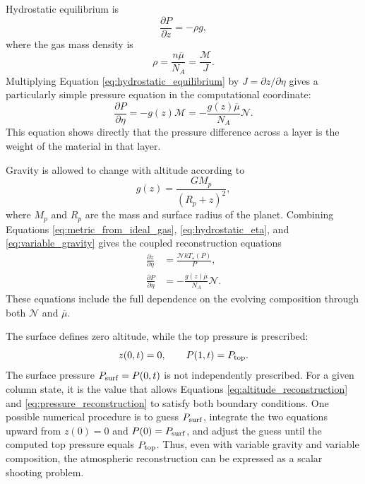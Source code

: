 \documentclass[twocolumn]{aastex631}
\begin{document}
Hydrostatic equilibrium is
\begin{equation}
  \frac{\partial P}{\partial z}=-\rho g,
  \label{eq:hydrostatic_equilibrium}
\end{equation}
where the gas mass density is
\begin{equation}
  \rho
  =\frac{n\overline{\mu}}{N_A}
  =\frac{\mathcal{M}}{J}.
  \label{eq:mass_density_reconstruction}
\end{equation}
Multiplying Equation \eqref{eq:hydrostatic_equilibrium} by
$J=\partial z/\partial\eta$ gives a particularly simple pressure equation in
the computational coordinate:
\begin{equation}
  \frac{\partial P}{\partial\eta}
  =-g(z)\mathcal{M}
  =-\frac{g(z)\overline{\mu}}{N_A}\mathcal{N}.
  \label{eq:hydrostatic_eta}
\end{equation}
This equation shows directly that the pressure difference across a layer is
the weight of the material in that layer.

Gravity is allowed to change with altitude according to
\begin{equation}
  g(z)=\frac{G M_p}{(R_p+z)^2},
  \label{eq:variable_gravity}
\end{equation}
where $M_p$ and $R_p$ are the mass and surface radius of the planet. Combining
Equations \eqref{eq:metric_from_ideal_gas}, \eqref{eq:hydrostatic_eta}, and
\eqref{eq:variable_gravity} gives the coupled reconstruction equations
\begin{align}
  \frac{\partial z}{\partial\eta}
  &=\frac{\mathcal{N}kT_\star(P)}{P},
  \label{eq:altitude_reconstruction}\\
  \frac{\partial P}{\partial\eta}
  &=-\frac{g(z)\overline{\mu}}{N_A}\mathcal{N}.
  \label{eq:pressure_reconstruction}
\end{align}
These equations include the full dependence on the evolving composition
through both $\mathcal{N}$ and $\overline{\mu}$.

The surface defines zero altitude, while the top pressure is prescribed:
\begin{equation}
  z(0,t)=0,
  \qquad
  P(1,t)=P_{\rm top}.
  \label{eq:reconstruction_boundary_conditions}
\end{equation}
The surface pressure $P_{\rm surf}=P(0,t)$ is not independently prescribed.
For a given column state, it is the value that allows Equations
\eqref{eq:altitude_reconstruction} and \eqref{eq:pressure_reconstruction} to
satisfy both boundary conditions. One possible numerical procedure is to
guess $P_{\rm surf}$, integrate the two equations upward from
$z(0)=0$ and $P(0)=P_{\rm surf}$, and adjust the guess until the computed top
pressure equals $P_{\rm top}$. Thus, even with variable gravity and variable
composition, the atmospheric reconstruction can be expressed as a scalar
shooting problem.
\end{document}
